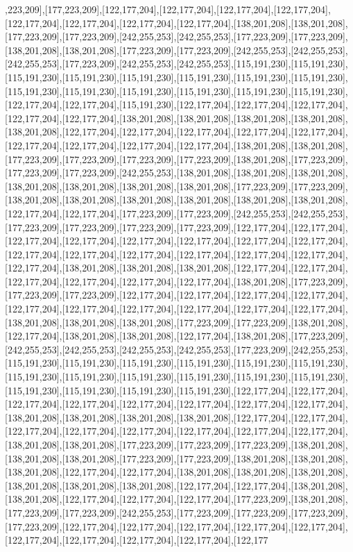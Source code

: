 ,223,209],[177,223,209],[122,177,204],[122,177,204],[122,177,204],[122,177,204],[122,177,204],[122,177,204],[122,177,204],[122,177,204],[138,201,208],[138,201,208],[177,223,209],[177,223,209],[242,255,253],[242,255,253],[177,223,209],[177,223,209],[138,201,208],[138,201,208],[177,223,209],[177,223,209],[242,255,253],[242,255,253],[242,255,253],[177,223,209],[242,255,253],[242,255,253],[115,191,230],[115,191,230],[115,191,230],[115,191,230],[115,191,230],[115,191,230],[115,191,230],[115,191,230],[115,191,230],[115,191,230],[115,191,230],[115,191,230],[115,191,230],[115,191,230],[122,177,204],[122,177,204],[115,191,230],[122,177,204],[122,177,204],[122,177,204],[122,177,204],[122,177,204],[138,201,208],[138,201,208],[138,201,208],[138,201,208],[138,201,208],[122,177,204],[122,177,204],[122,177,204],[122,177,204],[122,177,204],[122,177,204],[122,177,204],[122,177,204],[122,177,204],[138,201,208],[138,201,208],[177,223,209],[177,223,209],[177,223,209],[177,223,209],[138,201,208],[177,223,209],[177,223,209],[177,223,209],[242,255,253],[138,201,208],[138,201,208],[138,201,208],[138,201,208],[138,201,208],[138,201,208],[138,201,208],[177,223,209],[177,223,209],[138,201,208],[138,201,208],[138,201,208],[138,201,208],[138,201,208],[138,201,208],[122,177,204],[122,177,204],[177,223,209],[177,223,209],[242,255,253],[242,255,253],[177,223,209],[177,223,209],[177,223,209],[177,223,209],[122,177,204],[122,177,204],[122,177,204],[122,177,204],[122,177,204],[122,177,204],[122,177,204],[122,177,204],[122,177,204],[122,177,204],[122,177,204],[122,177,204],[122,177,204],[122,177,204],[122,177,204],[138,201,208],[138,201,208],[138,201,208],[122,177,204],[122,177,204],[122,177,204],[122,177,204],[122,177,204],[122,177,204],[138,201,208],[177,223,209],[177,223,209],[177,223,209],[122,177,204],[122,177,204],[122,177,204],[122,177,204],[122,177,204],[122,177,204],[122,177,204],[122,177,204],[122,177,204],[122,177,204],[138,201,208],[138,201,208],[138,201,208],[177,223,209],[177,223,209],[138,201,208],[122,177,204],[138,201,208],[138,201,208],[122,177,204],[138,201,208],[177,223,209],[242,255,253],[242,255,253],[242,255,253],[242,255,253],[177,223,209],[242,255,253],[115,191,230],[115,191,230],[115,191,230],[115,191,230],[115,191,230],[115,191,230],[115,191,230],[115,191,230],[115,191,230],[115,191,230],[115,191,230],[115,191,230],[115,191,230],[115,191,230],[115,191,230],[115,191,230],[122,177,204],[122,177,204],[122,177,204],[122,177,204],[122,177,204],[122,177,204],[122,177,204],[122,177,204],[138,201,208],[138,201,208],[138,201,208],[138,201,208],[122,177,204],[122,177,204],[122,177,204],[122,177,204],[122,177,204],[122,177,204],[122,177,204],[122,177,204],[138,201,208],[138,201,208],[177,223,209],[177,223,209],[177,223,209],[138,201,208],[138,201,208],[138,201,208],[177,223,209],[177,223,209],[138,201,208],[138,201,208],[138,201,208],[122,177,204],[122,177,204],[138,201,208],[138,201,208],[138,201,208],[138,201,208],[138,201,208],[138,201,208],[122,177,204],[122,177,204],[138,201,208],[138,201,208],[122,177,204],[122,177,204],[122,177,204],[177,223,209],[138,201,208],[177,223,209],[177,223,209],[242,255,253],[177,223,209],[177,223,209],[177,223,209],[177,223,209],[122,177,204],[122,177,204],[122,177,204],[122,177,204],[122,177,204],[122,177,204],[122,177,204],[122,177,204],[122,177,204],[122,177